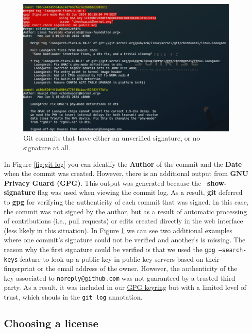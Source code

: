 \begin{figure}[h]
    \centering
    \includegraphics[width=\textwidth,keepaspectratio]{figures/git-log-bad.png}
    \caption{Git commits that have either an unverified signature, or no
             signature at all.}
    \label{fig:git-log-bad}
\end{figure}

In Figure \ref{fig:git-log} you can identify the \textbf{Author} of the
commit and the \textbf{Date} when the commit was created. However, there is an
additional output from \textbf{GNU Privacy Guard (GPG)}. This output was
generated because the \textbf{--show-signature} flag was used when viewing the
commit log. As a result, \textbf{git} deferred to \textbf{gpg} for verifying the
authenticity of each commit that was signed. In this case, the commit was not
signed by the author, but as a result of automatic processing of contributions
(i.e., pull requests) or edits created directly in the web interface (less
likely in this situation). In Figure \ref{fig:git-log-bad} we can see two
additional examples where one commit's signature could not be verified and
another's is missing. The reason why the first signature could be verified is
that we used the \texttt{gpg --search-keys} feature to look up a public key in
public key servers based on their fingerprint or the email address of the
owner. However, the authenticity of the key associated to
\texttt{noreply@github.com} was not guaranteed by a trusted third party. As a
result, it was included in our \href{https://www.gnupg.org/gph/en/manual/c235.html}
{GPG keyring} but with a limited level of trust, which shouls in the
\texttt{git log} annotation.

\subsection{Choosing a license}


